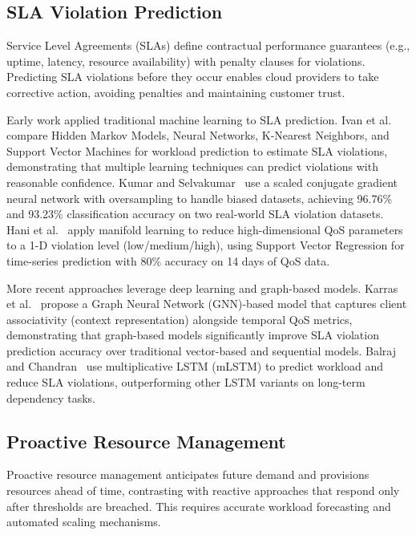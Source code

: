 \subsection{SLA Violation Prediction}
\label{subsec:sla}

Service Level Agreements (SLAs) define contractual performance guarantees (e.g., uptime, latency, resource availability) with penalty clauses for violations. Predicting SLA violations before they occur enables cloud providers to take corrective action, avoiding penalties and maintaining customer trust.

Early work applied traditional machine learning to SLA prediction. Ivan et al.~\cite{SLAViolationML19} compare Hidden Markov Models, Neural Networks, K-Nearest Neighbors, and Support Vector Machines for workload prediction to estimate SLA violations, demonstrating that multiple learning techniques can predict violations with reasonable confidence. Kumar and Selvakumar~\cite{SLAViolationSCG19} use a scaled conjugate gradient neural network with oversampling to handle biased datasets, achieving 96.76\% and 93.23\% classification accuracy on two real-world SLA violation datasets. Hani et al.~\cite{ManifoldSLA17} apply manifold learning to reduce high-dimensional QoS parameters to a 1-D violation level (low/medium/high), using Support Vector Regression for time-series prediction with 80\% accuracy on 14 days of QoS data.

More recent approaches leverage deep learning and graph-based models. Karras et al.~\cite{GNNSLA23} propose a Graph Neural Network (GNN)-based model that captures client associativity (context representation) alongside temporal QoS metrics, demonstrating that graph-based models significantly improve SLA violation prediction accuracy over traditional vector-based and sequential models. Balraj and Chandran~\cite{WorkloadmLSTM24} use multiplicative LSTM (mLSTM) to predict workload and reduce SLA violations, outperforming other LSTM variants on long-term dependency tasks.

\subsection{Proactive Resource Management}
\label{subsec:proactive}

Proactive resource management anticipates future demand and provisions resources ahead of time, contrasting with reactive approaches that respond only after thresholds are breached. This requires accurate workload forecasting and automated scaling mechanisms.

